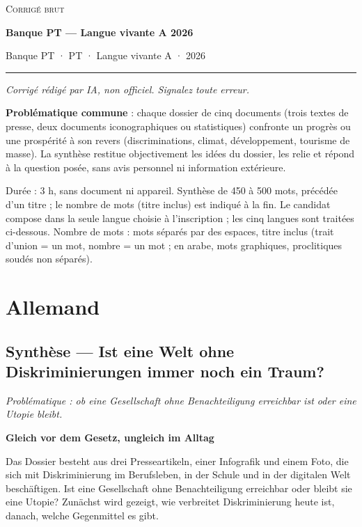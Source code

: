 \documentclass[11pt,a4paper]{article}
\begin{document}
\thispagestyle{plain}
\begin{center}
  {\small\scshape Corrigé brut}\par\smallskip
  {\LARGE\bfseries Banque PT — Langue vivante A 2026\par}\medskip
  {\large Banque PT · PT · Langue vivante A · 2026\par}
\end{center}
\vspace{2pt}\hrule\vspace{8pt}

\emph{Corrigé rédigé par IA, non officiel. Signalez toute erreur.}

\textbf{Problématique commune} : chaque dossier de cinq documents (trois textes de presse, deux documents iconographiques ou statistiques) confronte un progrès ou une prospérité à son revers (discriminations, climat, développement, tourisme de masse). La synthèse restitue objectivement les idées du dossier, les relie et répond à la question posée, sans avis personnel ni information extérieure.

Durée : 3 h, sans document ni appareil. Synthèse de 450 à 500 mots, précédée d'un titre ; le nombre de mots (titre inclus) est indiqué à la fin. Le candidat compose dans la seule langue choisie à l'inscription ; les cinq langues sont traitées ci-dessous. Nombre de mots : mots séparés par des espaces, titre inclus (trait d'union = un mot, nombre = un mot ; en arabe, mots graphiques, proclitiques soudés non séparés).

\hypertarget{allemand}{%
\section{Allemand}\label{allemand}}

\hypertarget{synthuxe8se-ist-eine-welt-ohne-diskriminierungen-immer-noch-ein-traum}{%
\subsection{Synthèse --- Ist eine Welt ohne Diskriminierungen immer noch ein Traum?}\label{synthuxe8se-ist-eine-welt-ohne-diskriminierungen-immer-noch-ein-traum}}

\emph{Problématique : ob eine Gesellschaft ohne Benachteiligung erreichbar ist oder eine Utopie bleibt.}

\textbf{Gleich vor dem Gesetz, ungleich im Alltag}

Das Dossier besteht aus drei Presseartikeln, einer Infografik und einem Foto, die sich mit Diskriminierung im Berufsleben, in der Schule und in der digitalen Welt beschäftigen. Ist eine Gesellschaft ohne Benachteiligung erreichbar oder bleibt sie eine Utopie? Zunächst wird gezeigt, wie verbreitet Diskriminierung heute ist, danach, welche Gegenmittel es gibt.
\end{document}
